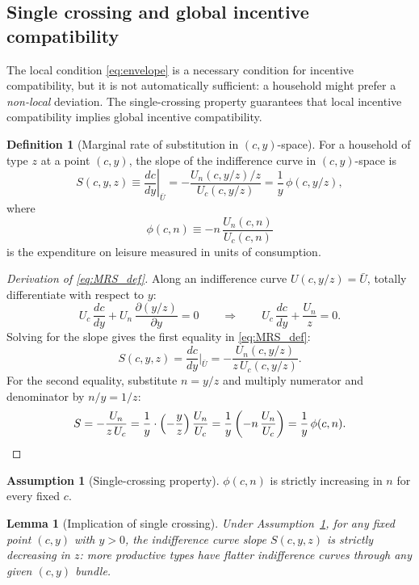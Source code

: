\documentclass[12pt,a4paper]{article}
\theoremstyle{definition}
\newtheorem{definition}{Definition}[section]
\newtheorem{assumption}{Assumption}[section]
\theoremstyle{plain}
\newtheorem{lemma}{Lemma}[section]
\theoremstyle{remark}
\begin{document}
\subsection{Single crossing and global incentive compatibility}
\label{sec:single_crossing}

The local condition \eqref{eq:envelope} is a necessary condition for incentive compatibility, but it is not automatically sufficient: a household might prefer a \emph{non-local} deviation. The single-crossing property guarantees that local incentive compatibility implies global incentive compatibility.

\begin{definition}[Marginal rate of substitution in $(c,y)$-space]
For a household of type $z$ at a point $(c,y)$, the slope of the indifference curve in $(c,y)$-space is
\begin{equation}
\label{eq:MRS_def}
  S(c, y, z) \equiv \left.\frac{dc}{dy}\right|_{\bar U} = -\frac{U_n(c, y/z) / z}{U_c(c, y/z)} = \frac{1}{y}\,\phi(c, y/z),
\end{equation}
where
\begin{equation}
\label{eq:phi_def}
  \phi(c, n) \equiv -n\,\frac{U_n(c,n)}{U_c(c,n)}
\end{equation}
is the expenditure on leisure measured in units of consumption.
\end{definition}

\begin{proof}[Derivation of \eqref{eq:MRS_def}]
Along an indifference curve $U(c, y/z) = \bar U$, totally differentiate with respect to $y$:
\[
  U_c \, \frac{dc}{dy} + U_n \, \frac{\partial(y/z)}{\partial y} = 0
  \qquad \Longrightarrow \qquad
  U_c \, \frac{dc}{dy} + \frac{U_n}{z} = 0.
\]
Solving for the slope gives the first equality in \eqref{eq:MRS_def}:
\[
  S(c, y, z) = \frac{dc}{dy}\bigg|_{\bar U} = -\frac{U_n(c, y/z)}{z\, U_c(c, y/z)}.
\]
For the second equality, substitute $n = y/z$ and multiply numerator and denominator by $n/y = 1/z$:
\[
  S = -\frac{U_n}{z\, U_c} = \frac{1}{y} \cdot \left(-\frac{y}{z}\right) \frac{U_n}{U_c}
  = \frac{1}{y}\left(-n\,\frac{U_n}{U_c}\right) = \frac{1}{y}\,\phi(c, n). \qedhere
\]
\end{proof}

\begin{assumption}[Single-crossing property]
\label{as:SC}
$\phi(c, n)$ is strictly increasing in $n$ for every fixed $c$.
\end{assumption}

\begin{lemma}[Implication of single crossing]
\label{lem:SC_slopes}
Under Assumption~\ref{as:SC}, for any fixed point $(c,y)$ with $y > 0$, the indifference curve slope $S(c,y,z)$ is strictly decreasing in $z$: more productive types have flatter indifference curves through any given $(c,y)$ bundle.
\end{lemma}
\end{document}
